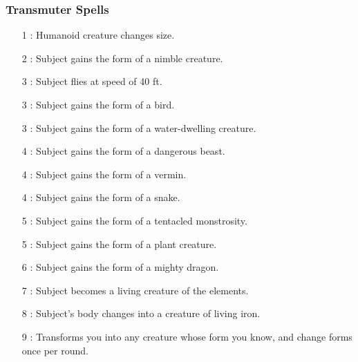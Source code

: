 \subsubsection{Transmuter Spells}
\begin{itemize}
\item[1] : Humanoid creature changes size.
\item[2] : Subject gains the form of a nimble creature.
\item[3] : Subject flies at speed of 40 ft.
\item[3] : Subject gains the form of a bird.
\item[3] : Subject gains the form of a water-dwelling creature.
\item[4] : Subject gains the form of a dangerous beast.
\item[4] : Subject gains the form of a vermin.
\item[4] : Subject gains the form of a snake.
\item[5] : Subject gains the form of a tentacled monstrosity.
\item[5] : Subject gains the form of a plant creature.
\item[6] : Subject gains the form of a mighty dragon.
\item[7] : Subject becomes a living creature of the elements.
\item[8] : Subject's body changes into a creature of living iron.
\item[9] : Transforms you into any creature whose form you know, and change forms once per round.
\end{itemize}







